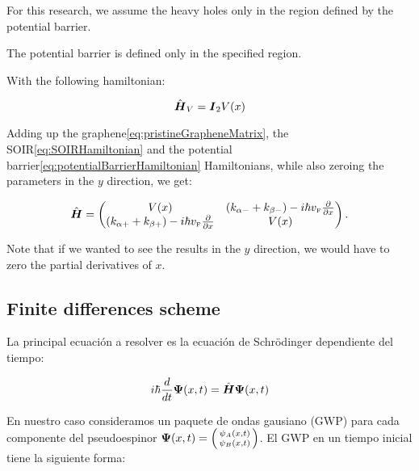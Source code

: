 \documentclass[twocolumn]{revtex4-2}
\newcommand{\bn}[1]{\mbox{\boldmath $#1$}}
\def\mb{\mbox}
\begin{document}
    For this research, we assume the heavy holes only in the region defined by the potential barrier.

    The potential barrier is defined only in the specified region.


    With the following hamiltonian:

    \begin{equation}
        \label{eq:potentialBarrierHamiltonian}
        \hat{\bn{H}}_V=\bn{I}_2 V(x)
    \end{equation}

    Adding up the graphene\eqref{eq:pristineGrapheneMatrix}, the SOIR\eqref{eq:SOIRHamiltonian} and the potential barrier\eqref{eq:potentialBarrierHamiltonian} Hamiltonians, while also zeroing the parameters in the $y$ direction, we get:

    \begin{equation}
        \label{eq:hybridHamiltonian}
        \hat{\bn{H}}=
        \begin{pmatrix}
            V(x) & \left(k_{\alpha-}+k_{\beta-}\right) - i\hbar v_{\mb{\tiny F}}\frac{\partial}{\partial x}\\
            \left(k_{\alpha+}+k_{\beta+}\right) - i\hbar v_{\mb{\tiny F}}\frac{\partial}{\partial x} & V(x)
        \end{pmatrix}.
    \end{equation}

    Note that if we wanted to see the results in the $y$ direction, we would have to zero the partial derivatives of $x$.

    \subsection{Finite differences scheme}\label{subsec:finite-differences-scheme}

    La principal ecuación a resolver es la ecuación de Schrödinger dependiente del tiempo:

    \begin{equation}
        \label{eq:schrodingerTimeDependent}
        i\hbar \frac{d}{dt}\bn{\Psi}(x,t) = \hat{\bn{H}}\bn{\Psi}(x,t)
    \end{equation}

    En nuestro caso consideramos un paquete de ondas gausiano (GWP) para cada componente del pseudoespinor $\bn{\Psi}(x,t)=\begin{psmallmatrix*}\psi_A(x,t)\\\psi_B(x,t)\end{psmallmatrix*}$.
    El GWP en un tiempo inicial tiene la siguiente forma:
\end{document}
